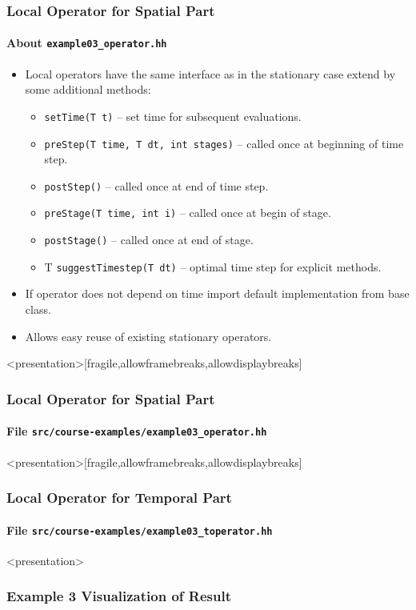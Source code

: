 \begin{frame}
\frametitle{Local Operator for Spatial Part}
\framesubtitle{About \lstinline{example03_operator.hh}}
\begin{itemize}
\item Local operators have the same interface as in the stationary case extend by some additional methods:
\begin{itemize}
\item \lstinline{setTime(T t)} -- set time for subsequent evaluations.
\item \lstinline{preStep(T time, T dt, int stages)} -- called once at beginning of time step.
\item \lstinline{postStep()} -- called once at end of time step.
\item \lstinline{preStage(T time, int i)} -- called once at begin of stage.
\item \lstinline{postStage()} -- called once at end of stage.
\item T \lstinline{suggestTimestep(T dt)} -- optimal time step for explicit methods.
\end{itemize}
\item If operator does not depend on time import default implementation from base class.
\item Allows easy reuse of existing stationary operators.
\end{itemize}
\end{frame}

\begin{frame}<presentation>[fragile,allowframebreaks,allowdisplaybreaks]
\frametitle<presentation>{Local Operator for Spatial Part}
\framesubtitle<presentation>{File \texttt{src/course-examples/example03\_operator.hh}}

\end{frame}

\begin{frame}<presentation>[fragile,allowframebreaks,allowdisplaybreaks]
\frametitle<presentation>{Local Operator for Temporal Part}
\framesubtitle<presentation>{File \texttt{src/course-examples/example03\_toperator.hh}}

\end{frame}

\begin{frame}<presentation>
\frametitle{Example 3 Visualization of Result}
\begin{center}
\end{center}
\end{frame}

\cleardoublepage
